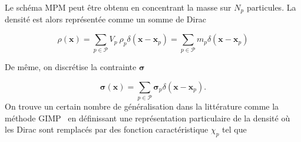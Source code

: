 
Le schéma MPM peut être obtenu en concentrant la masse sur $N_p$ particules. La densité est alors représentée comme un somme de Dirac

\begin{equation*}
    \rho(\bm x) = \sum_{p \in \mathcal P} V_p~\rho_p \delta(\bm x - \bm x_p) = \sum_{p \in \mathcal P} m_p \delta(\bm x - \bm x_p)
\end{equation*}

De même, on discrétise la contrainte $\bm \sigma$

\begin{equation*}
    \bm \sigma(\bm x) = \sum_{p \in \mathcal P} \bm \sigma_p \delta(\bm x - \bm x_p).
\end{equation*}
On trouve un certain nombre de généralisation dans la littérature comme la méthode GIMP~\cite{bardenhagen_generalized_2004} en définissant une représentation particulaire de la densité où les Dirac sont remplacés par des fonction caractéristique $\chi_p$ tel que

